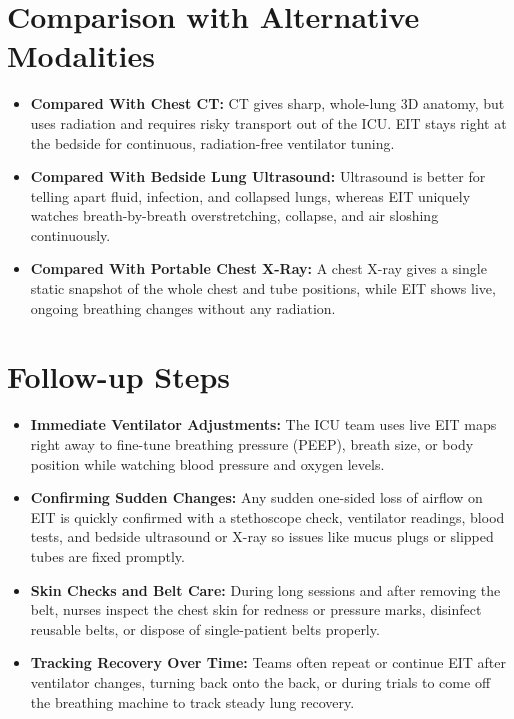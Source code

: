 \section{Comparison with Alternative Modalities}
\begin{itemize}
    \item \textbf{Compared With Chest CT:} CT gives sharp, whole-lung 3D anatomy, but uses radiation and requires risky transport out of the ICU. EIT stays right at the bedside for continuous, radiation-free ventilator tuning.
    \item \textbf{Compared With Bedside Lung Ultrasound:} Ultrasound is better for telling apart fluid, infection, and collapsed lungs, whereas EIT uniquely watches breath-by-breath overstretching, collapse, and air sloshing continuously.
    \item \textbf{Compared With Portable Chest X-Ray:} A chest X-ray gives a single static snapshot of the whole chest and tube positions, while EIT shows live, ongoing breathing changes without any radiation.
\end{itemize}

\section{Follow-up Steps}
\begin{itemize}
    \item \textbf{Immediate Ventilator Adjustments:} The ICU team uses live EIT maps right away to fine-tune breathing pressure (PEEP), breath size, or body position while watching blood pressure and oxygen levels.
    \item \textbf{Confirming Sudden Changes:} Any sudden one-sided loss of airflow on EIT is quickly confirmed with a stethoscope check, ventilator readings, blood tests, and bedside ultrasound or X-ray so issues like mucus plugs or slipped tubes are fixed promptly.
    \item \textbf{Skin Checks and Belt Care:} During long sessions and after removing the belt, nurses inspect the chest skin for redness or pressure marks, disinfect reusable belts, or dispose of single-patient belts properly.
    \item \textbf{Tracking Recovery Over Time:} Teams often repeat or continue EIT after ventilator changes, turning back onto the back, or during trials to come off the breathing machine to track steady lung recovery.
\end{itemize}

